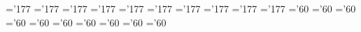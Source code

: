 
\let\preloaded=\undefined %

\skewchar\eighteeni='177 \skewchar\fourteeni='177 \skewchar\twelvei='177
\skewchar\eleveni='177 \skewchar\teni='177 \skewchar\ninei='177
\skewchar\eighti='177 \skewchar\seveni='177 \skewchar\sixi='177
\skewchar\fivei='177
\skewchar\eighteensy='60 \skewchar\fourteensy='60 \skewchar\twelvesy='60
\skewchar\elevensy='60 \skewchar\tensy='60 \skewchar\ninesy='60
\skewchar\eightsy='60 \skewchar\sevensy='60 \skewchar\sixsy='60
\skewchar\fivesy='60

\let\usereighteenpointmacro=\relax
\def\eighteenpoint{\let\pointsize=\eighteenpoint
  \textfont0=\eighteenrm \scriptfont0=\twelverm \scriptscriptfont0=\ninerm
  \def\rm{\fam\z@\eighteenrm}%
  \textfont1=\eighteeni \scriptfont1=\twelvei \scriptscriptfont1=\ninei
  \def\mit{\fam\@ne}\def\oldstyle{\fam\@ne\eighteeni}%
  \textfont2=\eighteensy \scriptfont2=\twelvesy \scriptscriptfont2=\ninesy
  \def\cal{\fam\tw@}%
  \textfont3=\eighteenex \scriptfont3=\eighteenex \scriptscriptfont3=\eighteenex%
  \textfont\itfam=\eighteenit
  \def\it{\fam\itfam\eighteenit}%
  \textfont\slfam=\eighteensl
  \def\sl{\fam\slfam\eighteensl}%
  \textfont\bffam=\eighteenbf \scriptfont\bffam=\twelvebf 
  \scriptscriptfont\bffam=\ninebf
  \def\bf{\fam\bffam\eighteenbf}%
  \textfont\ttfam=\eighteentt
  \def\tt{\fam\ttfam\eighteentt}%
  \def\big##1{{\hbox{$\left##1\vbox to15.3\p@{}\right.\n@space$}}}%
  \def\Big##1{{\hbox{$\left##1\vbox to20.7\p@{}\right.\n@space$}}}%
  \def\bigg##1{{\hbox{$\left##1\vbox to26.1\p@{}\right.\n@space$}}}%
  \def\Bigg##1{{\hbox{$\left##1\vbox to31.5\p@{}\right.\n@space$}}}%
  \setnormalsp@cing
  \usereighteenpointmacro
  }

\let\usersixteenpointmacro=\relax
\def\sixteenpoint{%
  \message{You have asked for 16pt, but you are getting 14pt fonts.
	   There are no 16pt CM fonts in the local font library.}%
  \fourteenpoint \let\pointsize=\sixteenpoint
  \usersixteenpointmacro
  }

